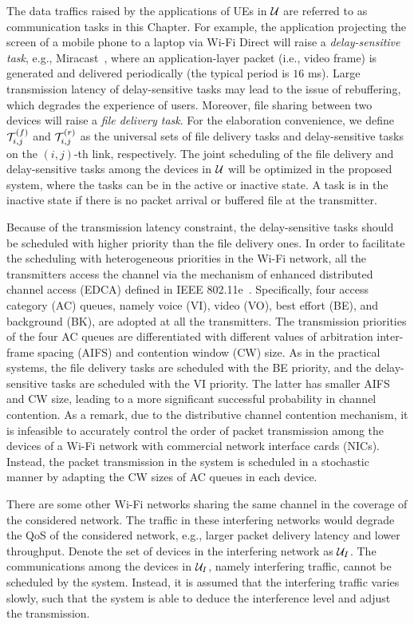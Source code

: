 The data traffics raised by the applications of UEs in $\mathcal{U}$ are referred to as communication tasks in this Chapter. For example, the application projecting the screen of a mobile phone to a laptop via Wi-Fi Direct will raise a {\it delay-sensitive task}, e.g., Miracast~\cite{WiFiDisplay2011}, where an application-layer packet (i.e., video frame) is generated and delivered periodically (the typical period is $16$ ms). Large transmission latency of delay-sensitive tasks may lead to the issue of rebuffering, which degrades the experience of users. Moreover, file sharing between two devices will raise a {\it file delivery task}. For the elaboration convenience, we define $\mathcal{T}_{i,j}^{(f)}$ and $\mathcal{T}_{i,j}^{(r)}$ as the universal sets of file delivery tasks and delay-sensitive tasks on the $(i,j)$-th link, respectively. The joint scheduling of the file delivery and delay-sensitive tasks among the devices in $\mathcal{U}$ will be optimized in the proposed {\algName} system, where the tasks can be in the active or inactive state. A task is in the inactive state if there is no packet arrival or buffered file at the transmitter.

Because of the transmission latency constraint, the delay-sensitive tasks should be scheduled with higher priority than the file delivery ones. In order to facilitate the scheduling with heterogeneous priorities in the Wi-Fi network, all the transmitters access the channel via the mechanism of enhanced distributed channel access (EDCA) defined in IEEE 802.11e~\cite{802.11e}. Specifically, four access category (AC) queues, namely {voice (VI), video (VO), best effort (BE), and background (BK)}, are adopted at all the transmitters. The transmission priorities of the four AC queues are differentiated with different values of arbitration inter-frame spacing (AIFS) and contention window (CW) size. As in the practical systems, the file delivery tasks are scheduled with the BE priority, and the delay-sensitive tasks are scheduled with the VI priority. The latter has smaller AIFS and CW size, leading to a more significant successful probability in channel contention. As a remark, due to the distributive channel contention mechanism, it is infeasible to accurately control the order of packet transmission among the devices of a Wi-Fi network with commercial network interface cards (NICs). Instead, the packet transmission in the {\algName} system is scheduled in a stochastic manner by adapting the CW sizes of AC queues in each device.

There are some other Wi-Fi networks sharing the same channel in the coverage of the considered network. The traffic in these interfering networks would degrade the QoS of the considered network, e.g., larger packet delivery latency and lower throughput. Denote the set of devices in the interfering network as $\mathcal{U}_I$. The communications among the devices in $\mathcal{U}_I$, namely interfering traffic, cannot be scheduled by the {\algName} system. Instead, it is assumed that the interfering traffic varies slowly, such that the {\algName} system is able to deduce the interference level and adjust the transmission.

